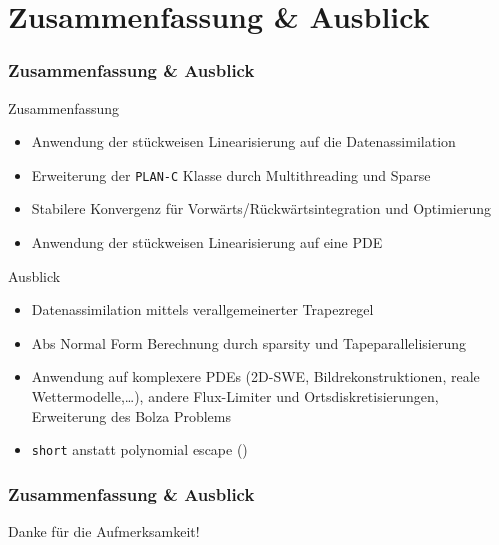 \section[Problemstellung]{Zusammenfassung \& Ausblick}
\begin{frame}[<+->]
\frametitle{Zusammenfassung \& Ausblick}

\begin{block}{Zusammenfassung}
 \begin{itemize}
  \item Anwendung der stückweisen Linearisierung auf die Datenassimilation
  \item Erweiterung der \texttt{PLAN-C} Klasse durch Multithreading und Sparse
  \item Stabilere Konvergenz für Vorwärts/Rückwärtsintegration und Optimierung
  \item Anwendung der stückweisen Linearisierung auf eine PDE
 \end{itemize}
\end{block}

\begin{block}{Ausblick}
 \begin{itemize}
  \item Datenassimilation mittels verallgemeinerter Trapezregel
  \item Abs Normal Form Berechnung durch sparsity und Tapeparallelisierung
  \item Anwendung auf komplexere PDEs (2D-SWE, Bildrekonstruktionen, reale Wettermodelle,\ldots ), andere Flux-Limiter und Ortsdiskretisierungen, Erweiterung des Bolza Problems
  \item \texttt{short} anstatt polynomial escape (\cite{griewank2014lipschitz})
 \end{itemize}

\end{block}

\end{frame}


\begin{frame}[<+->]
\frametitle{Zusammenfassung \& Ausblick}
\centering 
Danke für die Aufmerksamkeit!
\end{frame}


